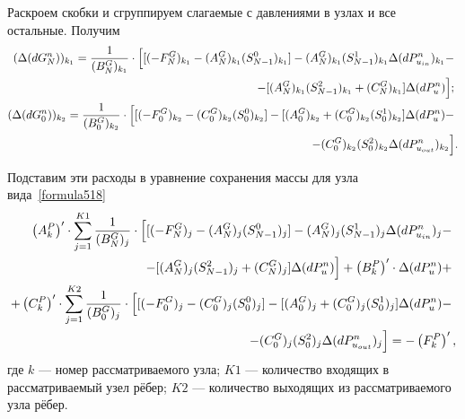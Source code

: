 Раскроем скобки и сгруппируем слагаемые с давлениями в узлах и все остальные. Получим
\begin{align}
\label{formula630}
(\Delta(dG_N^n))_{k_1} = \frac{1}{(B_N^G)_{k_1}}\cdot \Big[[(-F_N^G)_{k_1}-(A_N^G)_{k_1}(S_{N-1}^0)_{k_1}]-(A_N^G)_{k_1}(S_{N-1}^1)_{k_1} \Delta(dP_{u_{in}}^n)_{k_1}-\notag ~\\
-[(A_N^G)_{k_1}(S_{N-1}^2)_{k_1}+(C_N^G)_{k_1}] \Delta(dP_u^n)      \Big]; \notag ~\\
(\Delta(dG_0^n))_{k_2} = \frac{1}{(B_0^G)_{k_2}}\cdot \Big[[(-F_0^G)_{k_2}-(C_0^G)_{k_2}(S_0^0)_{k_2}]-[(A_0^G)_{k_2}+(C_0^G)_{k_2}(S_0^1)_{k_2}]\Delta(dP_u^n) - \notag ~\\
- (C_0^G)_{k_2}(S_0^2)_{k_2} \Delta(dP_{u_{out}}^n)_{k_2} \Big].
\end{align}

Подставим эти расходы в уравнение сохранения массы для узла вида~\eqref{formula518}
\begin{align}
\label{formula631}
\left(A_k^P \right)'\cdot \sum_{j=1}^{K1} \frac{1}{(B_N^G)_j}\cdot \Big[[(-F_N^G)_j-(A_N^G)_j(S_{N-1}^0)_j]-(A_N^G)_j(S_{N-1}^1)_j \Delta(dP_{u_{in}}^n)_j - \notag ~\\
-[(A_N^G)_j(S_{N-1}^2)_j+(C_N^G)_j] \Delta(dP_u^n) \Big] + \left(B_k^P \right)' \cdot \Delta(dP_u^n) + \notag ~\\ 
+ \left(C_k^P \right)'\cdot \sum_{j=1}^{K2} \frac{1}{(B_0^G)_j}\cdot \Big[[(-F_0^G)_j-(C_0^G)_j(S_0^0)_j]-[(A_0^G)_j+(C_0^G)_j(S_0^1)_j]\Delta(dP_u^n) - \notag ~\\
- (C_0^G)_j(S_0^2)_j \Delta(dP_{u_{out}}^n)_j \Big] = -\left(F_k^P \right)',
\end{align}
где $k$ --- номер рассматриваемого узла; $K1$ --- количество входящих в рассматриваемый узел рёбер; $K2$ --- количество выходящих из рассматриваемого узла рёбер.

